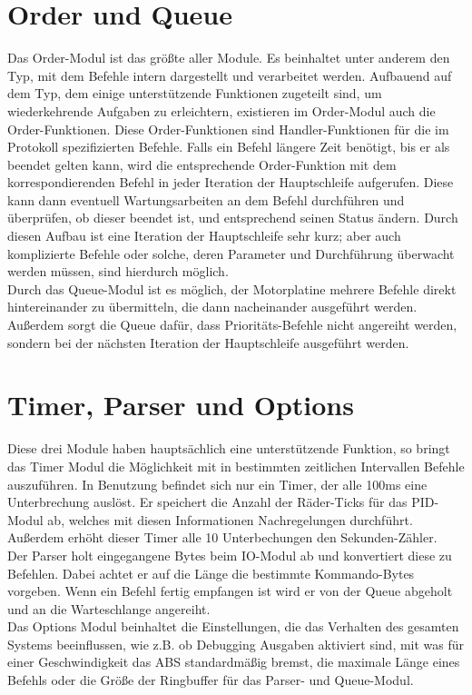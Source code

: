 \section{Order und Queue}
Das Order-Modul ist das größte aller Module. Es beinhaltet unter anderem den Typ, mit dem Befehle
intern dargestellt und verarbeitet werden. Aufbauend auf dem Typ, dem einige unterstützende
Funktionen zugeteilt sind, um wiederkehrende Aufgaben zu erleichtern, existieren im Order-Modul
auch die Order-Funktionen. Diese Order-Funktionen sind Handler-Funktionen für die
im Protokoll spezifizierten Befehle. Falls ein Befehl längere Zeit benötigt, bis er als beendet
gelten kann, wird die entsprechende Order-Funktion mit dem korrespondierenden Befehl in jeder
Iteration der Hauptschleife aufgerufen. Diese kann dann eventuell Wartungsarbeiten an dem
Befehl durchführen und überprüfen, ob dieser beendet ist, und entsprechend seinen Status ändern.
Durch diesen Aufbau ist eine Iteration der Hauptschleife sehr kurz; aber auch komplizierte Befehle
oder solche, deren Parameter und Durchführung überwacht werden müssen, sind hierdurch möglich.\\
Durch das Queue-Modul ist es möglich, der Motorplatine mehrere Befehle direkt hintereinander
zu übermitteln, die dann nacheinander ausgeführt werden. Außerdem sorgt die
Queue dafür, dass Prioritäts-Befehle nicht angereiht werden, sondern bei der nächsten
Iteration der Hauptschleife ausgeführt werden.
\section{Timer, Parser und Options}
Diese drei Module haben hauptsächlich eine unterstützende Funktion, so bringt das Timer Modul
die Möglichkeit mit in bestimmten zeitlichen Intervallen Befehle auszuführen. In Benutzung
befindet sich nur ein Timer, der alle 100ms eine Unterbrechung auslöst. Er speichert die Anzahl
der Räder-Ticks für das PID-Modul ab, welches mit diesen Informationen Nachregelungen durchführt.
Außerdem erhöht dieser Timer alle 10 Unterbechungen den Sekunden-Zähler.\\
Der Parser holt eingegangene Bytes beim IO-Modul ab und konvertiert diese zu Befehlen. Dabei
achtet er auf die Länge die bestimmte Kommando-Bytes vorgeben. Wenn ein Befehl fertig empfangen ist
wird er von der Queue abgeholt und an die Warteschlange angereiht.\\
Das Options
Modul beinhaltet die Einstellungen, die das Verhalten des gesamten Systems beeinflussen, wie
z.B. ob Debugging Ausgaben aktiviert sind, mit was für einer Geschwindigkeit das ABS standardmäßig bremst,
die maximale Länge eines Befehls oder die Größe der Ringbuffer für das Parser- und Queue-Modul.
